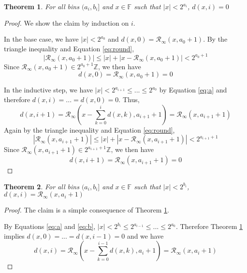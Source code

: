 \documentclass[12pt]{article}
\providecommand{\F}{\ensuremath{\mathbb{F}}}
\providecommand{\Z}{\ensuremath{\mathbb{Z}}}
\providecommand{\roundtonearestinfty}{\ensuremath{\mathcal{R}_\text{$\infty$}}}
\theoremstyle{plain}
\newtheorem{thm}{Theorem}[section]
\numberwithin{equation}{section}
\begin{document}
    \begin{thm}
      For all bins $(a_i, b_i]$ and $x \in \F$ such that $|x| < 2^{a_i}$, $d(x, i) = 0$
      \label{thm:dzero}
    \end{thm}
    \begin{proof}
      We show the claim by induction on $i$.

      In the base case, we have $|x| < 2^{a_0}$ and $d(x, 0) = \roundtonearestinfty(x, a_0 + 1)$. By the triangle inequality and Equation \ref{eq:round},
      \begin{equation*}
        |\roundtonearestinfty(x, a_0 + 1)| \leq |x| + |x - \roundtonearestinfty(x, a_0 + 1)| < 2^{a_0 + 1}
      \end{equation*}
      Since $\roundtonearestinfty(x, a_0 + 1) \in 2^{a_0 + 1}\Z$, we then have
      \begin{equation*}
        d(x, 0) = \roundtonearestinfty(x, a_0 + 1) = 0
      \end{equation*}

      In the inductive step, we have $|x| < 2^{a_{i + 1}} \leq ... \leq 2^{a_0}$ by Equation \ref{eq:a} and therefore $d(x, i)= ... = d(x, 0) = 0$. Thus,
      \begin{equation*}
        d(x, i + 1) = \roundtonearestinfty(x - \sum\limits_{k = 0}^{i}d(x, k), a_{i + 1} + 1) = \roundtonearestinfty(x, a_{i+1} + 1)
      \end{equation*}
      Again by the triangle inequality and Equation \ref{eq:round},
      \begin{equation*}
        |\roundtonearestinfty(x, a_{i + 1} + 1)| \leq |x| + |x - \roundtonearestinfty(x, a_{i + 1} + 1)| < 2^{a_{i + 1} + 1}
      \end{equation*}
      Since $\roundtonearestinfty(x, a_{i + 1} + 1) \in 2^{a_{i + 1} + 1}\Z$, we then have
      \begin{equation*}
        d(x, i + 1) = \roundtonearestinfty(x, a_{i + 1} + 1) = 0
      \end{equation*}
    \end{proof}

    \begin{thm}
      For all bins $(a_i, b_i]$ and $x \in \F$ such that $|x| < 2^{b_i}$, $d(x, i) = \roundtonearestinfty(x, a_i + 1)$
      \label{thm:dmiddle}
    \end{thm}
    \begin{proof}
      The claim is a simple consequence of Theorem \ref{thm:dzero}.

      By Equations \ref{eq:a} and \ref{eq:b}, $|x| < 2^{b_i} \leq 2^{a_{i - 1}} \leq  ... \leq 2^{a_0}$. Therefore Theorem \ref{thm:dzero} implies $d(x, 0) = ... = d(x, i - 1) = 0$ and we have
      \begin{equation*}
        d(x, i) = \roundtonearestinfty(x - \sum\limits_{k = 0}^{i - 1}d(x, k), a_{i} + 1) = \roundtonearestinfty(x, a_{i} + 1)
      \end{equation*}
    \end{proof}
\end{document}
